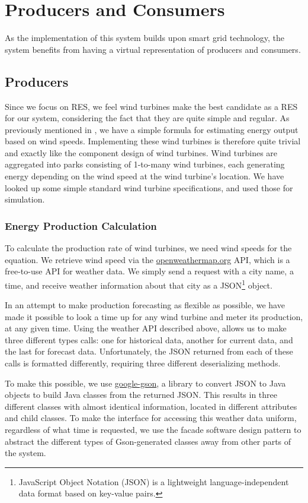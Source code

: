 \section{Producers and Consumers}\label{sec:prosumer}
As the implementation of this system builds upon smart grid technology, the system benefits from having a virtual representation of producers and consumers. 

\subsection{Producers}
Since we focus on RES, we feel wind turbines make the best candidate as a RES for our system, considering the fact that they are quite simple and regular. As previously mentioned in , we have a simple formula for estimating energy output based on wind speeds. Implementing these wind turbines is therefore quite trivial and exactly like the component design of wind turbines. Wind turbines are aggregated into parks consisting of 1-to-many wind turbines, each generating energy depending on the wind speed at the wind turbine's location. We have looked up some simple standard wind turbine specifications, and used those for simulation. 

\subsubsection{Energy Production Calculation}
To calculate the production rate of wind turbines, we need wind speeds for the equation. We retrieve wind speed via the \href{openweathermap.org}{openweathermap.org} API, which is a free-to-use API for weather data. We simply send a request with a city name, a time, and receive weather information about that city as a JSON\footnote{JavaScript Object Notation (JSON) is a lightweight language-independent data format based on key-value pairs.} object. 

In an attempt to make production forecasting as flexible as possible, we have made it possible to look a time up for any wind turbine and meter its production, at any given time. Using the weather API described above, allows us to make three different types calls: one for historical data, another for current data, and the last for forecast data. Unfortunately, the JSON returned from each of these calls is formatted differently, requiring three different deserializing methods.

To make this possible, we use \href{https://code.google.com/p/google-gson/}{google-gson}, a library to convert JSON to Java objects to build Java classes from the returned JSON. This results in three different classes with almost identical information, located in different attributes and child classes. To make the interface for accessing this weather data uniform, regardless of what time is requested, we use the facade software design pattern to abstract the different types of Gson-generated classes away from other parts of the system.

